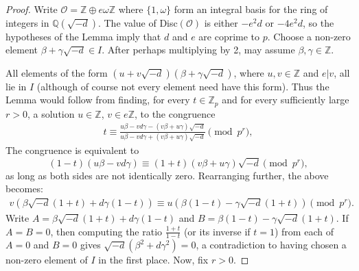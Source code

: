\documentclass[10pt,a4paper]{amsart}
\newcommand{\zed}{\ensuremath{\mathbb{Z}}}
\newcommand{\kew}{\ensuremath{\mathbb{Q}}}
\newcommand{\oh}{\ensuremath{\mathcal{O}}}
\begin{document}
	\begin{proof}
		
		Write $\oh = \zed\oplus e\omega \zed$ where $\{1,\omega\}$ form an integral basis for the ring of integers in $\kew(\sqrt{-d})$. The value of Disc$(\oh)$ is either $-e^2d$ or $-4e^2d$, so the hypotheses of the Lemma imply that $d$ and $e$ are coprime to $p$. Choose a non-zero element $\beta+\gamma\sqrt{-d}\in I$. After perhaps multiplying by 2, may assume $\beta,\gamma\in \zed$. 
		
		
	
	All elements of the form $(u+v\sqrt{-d})(\beta+\gamma\sqrt{-d})$, where $u,v\in\zed$ and $e|v$, all lie in $I$ (although of course not every element need have this form). Thus the Lemma would follow from finding, for every $t\in \zed_p$ and for every sufficiently large $r>0$, a solution $u\in \zed$, $v\in e\zed$, to the congruence 
	\begin{align}\label{Case1Cong}
		t\equiv \frac{u\beta-vd\gamma-(v\beta+u\gamma)\sqrt{-d}}{u\beta-vd\gamma+(v\beta+u\gamma)\sqrt{-d}}\pmod{p^r},
	\end{align}
	The congruence is equivalent to 	
		\[
		(1-t)(u\beta-vd\gamma) \equiv (1+t)(v\beta+u\gamma)\sqrt{-d} \pmod{p^r},\] as long as both sides are not identically zero.	Rearranging further, the above becomes:		
		\begin{align*} v(\beta\sqrt{-d}(1+t)+d\gamma(1-t))\equiv u(\beta(1-t)-\gamma\sqrt{-d}(1+t))\pmod{p^r}.\end{align*}		
		Write $A = \beta\sqrt{-d}(1+t)+d\gamma(1-t)$ and $B= \beta(1-t)-\gamma\sqrt{-d}(1+t)$. If $A=B=0$, then computing the ratio $\frac{1+t}{1-t}$ (or its inverse if $t=1$) from each of $A=0$ and $B=0$ gives $\sqrt{-d}(\beta^2+d\gamma^2)=0$, a contradiction to having chosen a non-zero element of $I$ in the first place. Now, fix $r>0$.
		
	
		

\end{proof}
\end{document}
